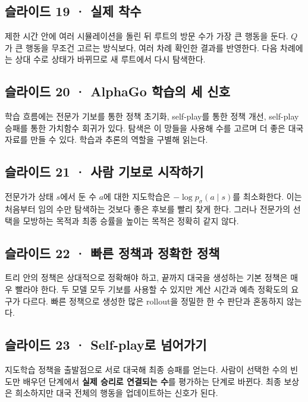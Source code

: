 \documentclass[11pt,a4paper]{article}
\begin{document}
\subsection{슬라이드 19 · 실제 착수}

제한 시간 안에 여러 시뮬레이션을 돌린 뒤 루트의 방문 수가 가장 큰 행동을 둔다. $Q$가 큰 행동을 무조건 고르는 방식보다, 여러 차례 확인한 결과를 반영한다. 다음 차례에는 상대 수로 상태가 바뀌므로 새 루트에서 다시 탐색한다.\par

\subsection{슬라이드 20 · AlphaGo 학습의 세 신호}

학습 흐름에는 전문가 기보를 통한 정책 초기화, self-play를 통한 정책 개선, self-play 승패를 통한 가치함수 회귀가 있다. 탐색은 이 망들을 사용해 수를 고르며 더 좋은 대국 자료를 만들 수 있다. 학습과 추론의 역할을 구별해 읽는다.\par

\subsection{슬라이드 21 · 사람 기보로 시작하기}

전문가가 상태 $s$에서 둔 수 $a$에 대한 지도학습은 $-\log p_\sigma(a\mid s)$를 최소화한다. 이는 처음부터 임의 수만 탐색하는 것보다 좋은 후보를 빨리 찾게 한다. 그러나 전문가의 선택을 모방하는 목적과 최종 승률을 높이는 목적은 정확히 같지 않다.\par

\subsection{슬라이드 22 · 빠른 정책과 정확한 정책}

트리 안의 정책은 상대적으로 정확해야 하고, 끝까지 대국을 생성하는 기본 정책은 매우 빨라야 한다. 두 모델 모두 기보를 사용할 수 있지만 계산 시간과 예측 정확도의 요구가 다르다. 빠른 정책으로 생성한 많은 rollout을 정밀한 한 수 판단과 혼동하지 않는다.\par

\subsection{슬라이드 23 · Self-play로 넘어가기}

지도학습 정책을 출발점으로 서로 대국해 최종 승패를 얻는다. 사람이 선택한 수의 빈도만 배우던 단계에서 \textbf{실제 승리로 연결되는 수}를 평가하는 단계로 바뀐다. 최종 보상은 희소하지만 대국 전체의 행동을 업데이트하는 신호가 된다.\par
\end{document}
